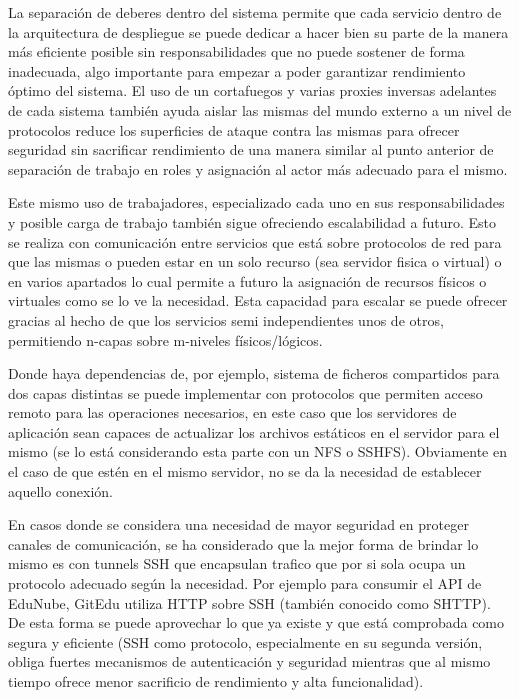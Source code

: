 La separación de deberes dentro del sistema permite que cada servicio dentro de la arquitectura de despliegue se puede dedicar a hacer bien su parte de la manera más eficiente posible sin responsabilidades que no puede sostener de forma inadecuada, algo importante para empezar a poder garantizar rendimiento óptimo del sistema. El uso de un cortafuegos y varias proxies inversas adelantes de cada sistema también ayuda aislar las mismas del mundo externo a un nivel de protocolos reduce los superficies de ataque contra las mismas para ofrecer seguridad sin sacrificar rendimiento de una manera similar al punto anterior de separación de trabajo en roles y asignación al actor más adecuado para el mismo.

Este mismo uso de trabajadores, especializado cada uno en sus responsabilidades y posible carga de trabajo también sigue ofreciendo escalabilidad a futuro. Esto se realiza con comunicación entre servicios que está sobre protocolos de red para que las mismas o pueden estar en un solo recurso (sea servidor fisica o virtual) o en varios apartados lo cual permite a futuro la asignación de recursos físicos o virtuales como se lo ve la necesidad. Esta capacidad para escalar se puede ofrecer gracias al hecho de que los servicios semi independientes unos de otros, permitiendo n-capas sobre m-niveles físicos/lógicos.

Donde haya dependencias de, por ejemplo, sistema de ficheros compartidos para dos capas distintas se puede implementar con protocolos que permiten acceso remoto para las operaciones necesarios, en este caso que los servidores de aplicación sean capaces de actualizar los archivos estáticos en el servidor para el mismo (se lo está considerando esta parte con un NFS o SSHFS). Obviamente en el caso de que estén en el mismo servidor, no se da la necesidad de establecer aquello conexión.

En casos donde se considera una necesidad de mayor seguridad en proteger canales de comunicación, se ha considerado que la mejor forma de brindar lo mismo es con tunnels SSH que encapsulan trafico que por si sola ocupa un protocolo adecuado según la necesidad. Por ejemplo para consumir el API de EduNube, GitEdu utiliza HTTP sobre SSH (también conocido como SHTTP). De esta forma se puede aprovechar lo que ya existe y que está comprobada como segura y eficiente (SSH como protocolo, especialmente en su segunda versión, obliga fuertes mecanismos de autenticación y seguridad mientras que al mismo tiempo ofrece menor sacrificio de rendimiento y alta funcionalidad).

